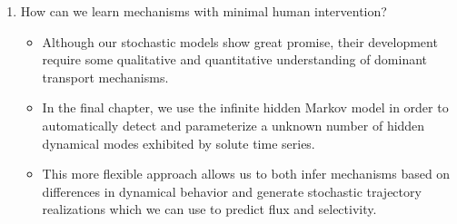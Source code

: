 \begin{enumerate}
\begin{itemize}
    	\end{itemize}
    \item How can we learn mechanisms with minimal human intervention?  %
    	\begin{itemize}
    	  \item Although our stochastic models show great promise, their development 
    	  require some qualitative and quantitative understanding of dominant transport
    	  mechanisms.
    	  \item In the final chapter, we use the infinite hidden Markov model in order
    	  to automatically detect and parameterize a unknown number of hidden dynamical modes
    	  exhibited by solute time series. 
    	  \item This more flexible approach allows us to both infer mechanisms based 
    	  on differences in dynamical behavior and generate stochastic trajectory realizations
    	  which we can use to predict flux and selectivity. 
    	\end{itemize}
  \end{enumerate} 
